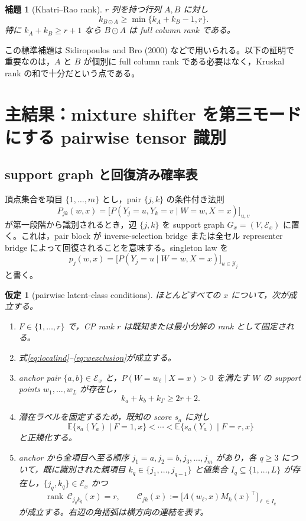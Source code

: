 \documentclass[11pt,a4paper]{ltjsarticle}
\newtheorem{assumption}{仮定}[section]
\newtheorem{lemma}{補題}[section]
\theoremstyle{remark}\newtheorem{remark}{注意}[section]
\newcommand{\E}{\mathbb E}
\newcommand{\cY}{\mathcal Y}
\newcommand{\cE}{\mathcal E}
\newcommand{\rank}{\operatorname{rank}}
\newcommand{\od}{\odot}
\begin{document}
\begin{lemma}[Khatri--Rao rank]\label{lem:kr}
$r$ 列を持つ行列 $A,B$ に対し
\begin{equation}
k_{B\od A}\ge \min\{k_A+k_B-1,r\}.\label{eq:kr-bound}
\end{equation}
特に $k_A+k_B\ge r+1$ なら $B\od A$ は full column rank である。
\end{lemma}

この標準補題は Sidiropoulos and Bro (2000) などで用いられる。以下の証明で重要なのは，$A$ と $B$ が個別に full column rank である必要はなく，Kruskal rank の和で十分だという点である。

\section{主結果：mixture shifter を第三モードにする pairwise tensor 識別}

\subsection{support graph と回復済み確率表}
頂点集合を項目 $\{1,\ldots,m\}$ とし，pair $\{j,k\}$ の条件付き法則
\[
P_{jk}(w,x)=\big[P(Y_j=u,Y_k=v\mid W=w,X=x)\big]_{u,v}
\]
が第一段階から識別されるとき，辺 $\{j,k\}$ を support graph $G_x=(V,\cE_x)$ に置く。これは，pair block が inverse-selection bridge または全セル representer bridge によって回復されることを意味する。singleton law を
\[
p_j(w,x)=\big[P(Y_j=u\mid W=w,X=x)\big]_{u\in\cY_j}
\]
と書く。

\begin{assumption}[pairwise latent-class conditions]\label{as:pair}
ほとんどすべての $x$ について，次が成立する。
\begin{enumerate}[label=(P\arabic*)]
\item $F\in\{1,\ldots,r\}$ で，CP rank $r$ は既知または最小分解の rank として固定される。
\item 式\eqref{eq:localind}--\eqref{eq:wexclusion}が成立する。
\item anchor pair $\{a,b\}\in\cE_x$ と，$P(W=w_\ell\mid X=x)>0$ を満たす $W$ の support points $w_1,\ldots,w_L$ が存在し，
\begin{equation}
k_a+k_b+k_\Gamma\ge2r+2.\label{eq:pair-kruskal}
\end{equation}
\item 潜在ラベルを固定するため，既知の score $s_a$ に対し
\[
\E\{s_a(Y_a)\mid F=1,x\}<\cdots<\E\{s_a(Y_a)\mid F=r,x\}
\]
と正規化する。
\item anchor から全項目へ至る順序 $j_1=a,j_2=b,j_3,\ldots,j_m$ があり，各 $q\ge3$ について，既に識別された親項目 $k_q\in\{j_1,\ldots,j_{q-1}\}$ と値集合 $I_q\subseteq\{1,\ldots,L\}$ が存在し，$\{j_q,k_q\}\in\cE_x$ かつ
\begin{equation}
\rank\,\mathcal C_{j_qk_q}(x)=r,\qquad
\mathcal C_{jk}(x):=
\big[\Lambda(w_\ell,x)M_k(x)^\top\big]_{\ell\in I_q}
\label{eq:prop-rank}
\end{equation}
が成立する。右辺の角括弧は横方向の連結を表す。
\end{enumerate}
\end{assumption}
\end{document}
